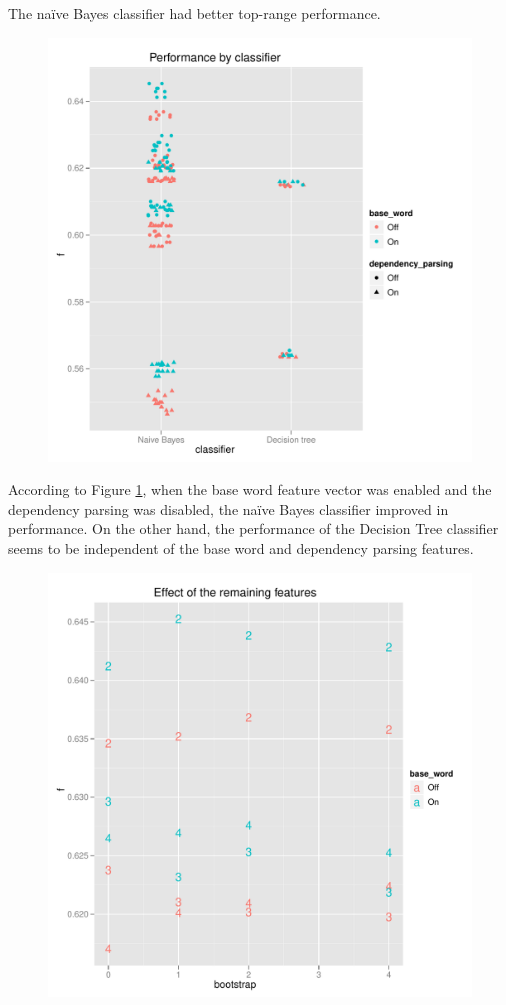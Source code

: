 \documentclass{article}
\newcommand{\naive}{na\"ive}
\begin{document}
The \naive{} Bayes classifier had better top-range performance.

\begin{figure}
\includegraphics[width=\textwidth]{pg_0003}
\caption{\label{fig3}}
\end{figure}

According to Figure \ref{fig3}, when the base word feature vector was
enabled and the dependency parsing was disabled, the \naive{} Bayes
classifier improved in performance. On the other hand, the performance
of the Decision Tree classifier seems to be independent of the base
word and dependency parsing features.

\begin{figure}
\includegraphics[width=\textwidth]{pg_0004}
\caption{\label{fig4}}
\end{figure}
\end{document}
